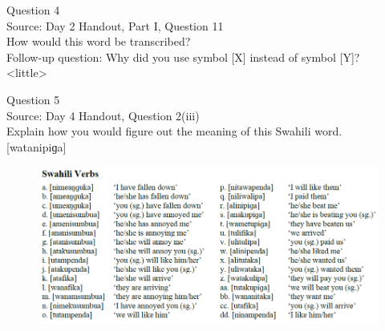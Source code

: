 \documentclass[12pt]{article}
\begin{document}
{\large Question 4}\\

Source: Day 2 Handout, Part I, Question 11\\

How would this word be transcribed?\\ Follow-up question: Why did you use symbol [X] instead of symbol [Y]?\\

<little>


\newpage

{\large Question 5}\\

Source: Day 4 Handout, Question 2(iii)\\

Explain how you would figure out the meaning of this Swahili word.\\

{[watanipiɡa]}

\begin{figure}[H]
\includegraphics{../images/swahiliverbs.png}
\end{figure}

\newpage

\begin{center}
\textbf{{\color{red}{\HUGE END OF EXAM}}}\\

\end{center}
\newpage

\begin{center}
\textbf{{\color{blue}{\HUGE START OF EXAM\\}}}

\textbf{{\color{blue}{\HUGE Student ID: 5581\\}}}

\textbf{{\color{blue}{\HUGE 2:45 - 3:00 PM\\}}}

\end{center}
\newpage
\end{document}
